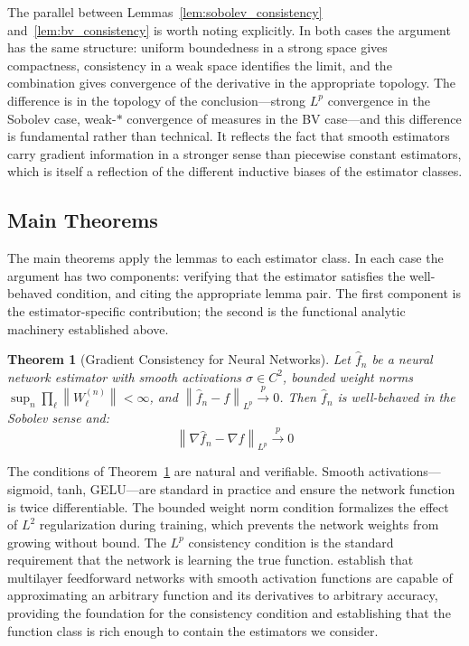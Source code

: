 \documentclass[12pt]{article}
\newtheorem{theorem}{Theorem}
\newcommand{\norm}[1]{\left\| #1 \right\|}
\newcommand{\fn}{\hat{f}_n}
\newcommand{\xrightarrowp}{\xrightarrow{p}}
\begin{document}
	The parallel between Lemmas~\ref{lem:sobolev_consistency}
	and~\ref{lem:bv_consistency} is worth noting explicitly. In both cases the argument
	has the same structure: uniform boundedness in a strong space gives compactness,
	consistency in a weak space identifies the limit, and the combination gives
	convergence of the derivative in the appropriate topology. The difference is in the
	topology of the conclusion---strong $L^p$ convergence in the Sobolev case, weak-$*$
	convergence of measures in the BV case---and this difference is fundamental rather
	than technical. It reflects the fact that smooth estimators carry gradient
	information in a stronger sense than piecewise constant estimators, which is itself a
	reflection of the different inductive biases of the estimator classes.
	
	\subsection{Main Theorems}
	
	The main theorems apply the lemmas to each estimator class. In each case the argument
	has two components: verifying that the estimator satisfies the well-behaved
	condition, and citing the appropriate lemma pair. The first component is the
	estimator-specific contribution; the second is the functional analytic machinery
	established above.
	
	\begin{theorem}[Gradient Consistency for Neural Networks]
		\label{thm:neural_nets}
		Let $\fn$ be a neural network estimator with smooth activations $\sigma \in C^2$,
		bounded weight norms $\sup_n \prod_\ell \norm{W_\ell^{(n)}} < \infty$, and
		$\norm{\fn - f}_{L^p} \xrightarrowp 0$. Then $\fn$ is well-behaved in the Sobolev
		sense and:
		\begin{equation}
			\norm{\nabla \fn - \nabla f}_{L^p} \xrightarrowp 0
		\end{equation}
	\end{theorem}
	
	The conditions of Theorem~\ref{thm:neural_nets} are natural and verifiable. Smooth activations---sigmoid, tanh, GELU---are standard in practice and ensure the network function is twice differentiable. The bounded weight norm condition formalizes the effect of $L^2$ regularization during training, which prevents the network weights from growing without bound. The $L^p$ consistency condition is the standard requirement that the network is learning the true function. \citet{hornik1990universal} establish that multilayer feedforward networks with smooth activation functions are capable of approximating an arbitrary function and its derivatives to arbitrary accuracy, providing the foundation for the consistency condition and establishing that the function class is rich enough to contain the estimators we consider.
	
\end{document}
